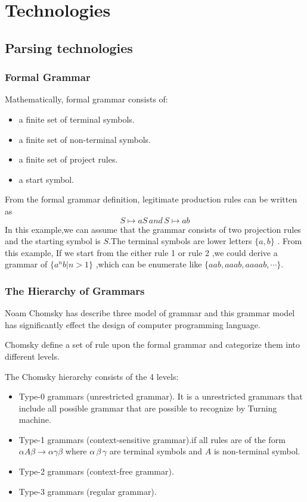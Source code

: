 \chapter{Technologies}
\section{Parsing technologies}
\subsection{Formal Grammar}

Mathematically, formal grammar consists of:
\begin{itemize}
\item a finite set of terminal symbols.
\item a finite set of non-terminal symbols.
\item a finite set of project rules.
\item a start symbol.
\end{itemize} \cite{aho1986compilers} \cite{three_model}
From the formal grammar definition, legitimate production rules can be written as 
 \[ S \mapsto aS  \,and \, S \mapsto ab \]
In this example,we can assume that the grammar consists of two projection rules and the starting symbol is $ S $.The terminal symbols are lower letters $ \{a ,b\} $ . From this example, If we start from the either rule 1 or rule 2 ,we could derive a  grammar of $ \{ a^n b | n>1  \}$ ,which can be enumerate like $ \{aab,aaab,aaaab,\cdots \} $.






\subsection{The Hierarchy of Grammars}
Noam Chomsky has describe three model of grammar \cite{three_model} and this grammar model has significantly effect the design of computer programming language.


Chomsky define a set of rule upon the formal grammar and categorize them into different levels.

The Chomsky hierarchy consists of the 4 levels:
\begin{itemize}
\item Type-0 grammars (unrestricted grammar). It is a unrestricted grammars that include all possible grammar that are possible to recognize by Turning machine.
\item Type-1 grammars (context-sensitive grammar).if all rules are of the form $  \alpha A \beta \rightarrow \alpha \gamma \beta$ where $ \alpha \,  \beta \, \gamma $ are terminal symbols and $ A $ is non-terminal symbol.
\item Type-2 grammars (context-free grammar). 
\item Type-3 grammars (regular grammar).
\end{itemize}



